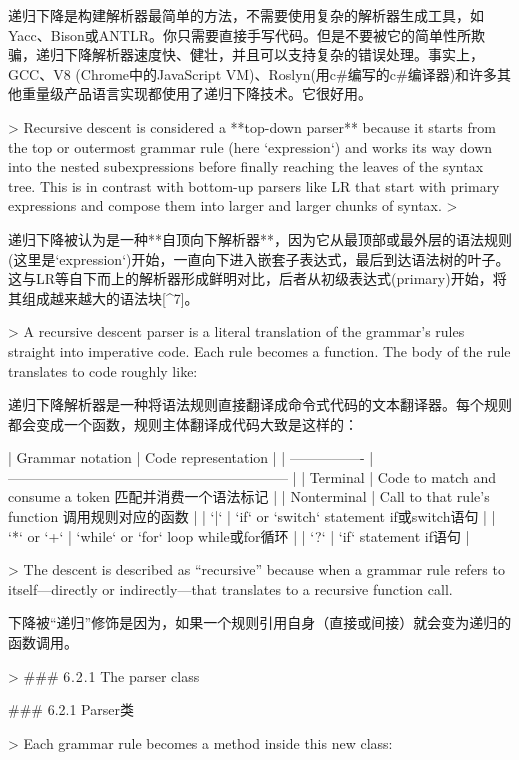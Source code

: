\documentclass[cn,11pt,chinese]{elegantbook}
\begin{document}
递归下降是构建解析器最简单的方法，不需要使用复杂的解析器生成工具，如Yacc、Bison或ANTLR。你只需要直接手写代码。但是不要被它的简单性所欺骗，递归下降解析器速度快、健壮，并且可以支持复杂的错误处理。事实上，GCC、V8 (Chrome中的JavaScript VM)、Roslyn(用c#编写的c#编译器)和许多其他重量级产品语言实现都使用了递归下降技术。它很好用。

> Recursive descent is considered a **top-down parser** because it starts from the top or outermost grammar rule (here `expression`) and works its way down into the nested subexpressions before finally reaching the leaves of the syntax tree. This is in contrast with bottom-up parsers like LR that start with primary expressions and compose them into larger and larger chunks of syntax.
>

递归下降被认为是一种**自顶向下解析器**，因为它从最顶部或最外层的语法规则(这里是`expression`)开始，一直向下进入嵌套子表达式，最后到达语法树的叶子。这与LR等自下而上的解析器形成鲜明对比，后者从初级表达式(primary)开始，将其组成越来越大的语法块[^7]。

> A recursive descent parser is a literal translation of the grammar’s rules straight into imperative code. Each rule becomes a function. The body of the rule translates to code roughly like:

递归下降解析器是一种将语法规则直接翻译成命令式代码的文本翻译器。每个规则都会变成一个函数，规则主体翻译成代码大致是这样的：

| Grammar notation | Code representation                                          |
| ---------------- | ------------------------------------------------------------ |
| Terminal         | Code to match and consume a token      匹配并消费一个语法标记 |
| Nonterminal      | Call to that rule’s function       调用规则对应的函数        |
| `|`              | `if` or `switch` statement      if或switch语句               |
| `*` or `+`       | `while` or `for` loop      while或for循环                    |
| `?`              | `if` statement      if语句                                   |

> The descent is described as “recursive” because when a grammar rule refers to itself—directly or indirectly—that translates to a recursive function call.

下降被“递归”修饰是因为，如果一个规则引用自身（直接或间接）就会变为递归的函数调用。

> ### 6 . 2 . 1 The parser class

### 6.2.1 Parser类

> Each grammar rule becomes a method inside this new class:
\end{document}

